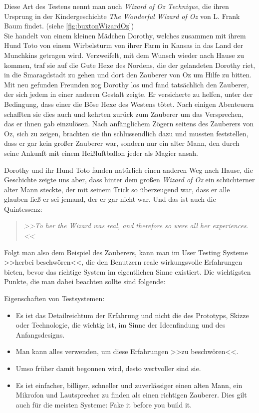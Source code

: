 \medskip Diese Art des Testens nennt man auch \emph{Wizard of Oz Technique}, die ihren Ursprung in der Kindergeschichte \emph{The Wonderful Wizard of Oz} von L. Frank Baum findet. (siehe \autoref{fig:buxtonWizardOz}) \\ Sie handelt von einem kleinen Mädchen Dorothy, welches zusammen mit ihrem Hund Toto von einem Wirbelsturm von ihrer Farm in Kansas in das Land der Munchkins getragen wird. Verzweifelt, mit dem Wunsch wieder nach Hause zu kommen, traf sie auf die Gute Hexe des Nordens, die der gelandeten Dorothy riet, in die Smaragdstadt zu gehen und dort den Zauberer von Oz um Hilfe zu bitten. Mit neu gefunden Freunden zog Dorothy los und fand tatsächlich den Zauberer, der sich jedem in einer anderen Gestalt zeigte. Er versicherte zu helfen, unter der Bedingung, dass einer die Böse Hexe des Westens tötet. Nach einigen Abenteuern schafften sie dies auch und kehrten zurück zum Zauberer um das Versprechen, das er ihnen gab einzulösen. Nach anfänglichem Zögern seitens des Zauberers von Oz, sich zu zeigen, brachten sie ihn schlussendlich dazu und mussten feststellen, dass er gar kein großer Zauberer war, sondern nur ein alter Mann, den durch seine Ankunft mit einem Heißluftballon jeder als Magier ansah. \citep{Baum:2008}

\medskip Dorothy und ihr Hund Toto fanden natürlich einen anderen Weg nach Hause, die Geschichte zeigte uns aber, dass hinter dem großen \emph{Wizard of Oz} ein schüchterner alter Mann steckte, der mit seinem Trick so überzeugend war, dass er alle glauben ließ er sei jemand, der er gar nicht war. Und das ist auch die Quintessenz: 

\begin{quote}
	\textsl{>>To her the Wizard was real, and therefore so were all her experiences.<<}
\begin{flushright}\citep{Buxton:2007}\end{flushright}
\end{quote}

Folgt man also dem Beispiel des Zauberers, kann man im User Testing Systeme >>herbei beschwören<<, die den Benutzern reale wirkungsvolle Erfahrungen bieten, bevor das richtige System im eigentlichen Sinne existiert. Die wichtigsten Punkte, die man dabei beachten sollte sind folgende:

\medskip Eigenschaften von Testsystemen:
\begin{itemize}
	\item Es ist das Detailreichtum der Erfahrung und nicht die des Prototyps, Skizze oder Technologie, die wichtig ist, im Sinne der Ideenfindung und des Anfangsdesigns.
	\item Man kann alles verwenden, um diese Erfahrungen >>zu beschwören<<.
	\item Umso früher damit begonnen wird, desto wertvoller sind sie.
	\item Es ist einfacher, billiger, schneller und zuverlässiger einen alten Mann, ein Mikrofon und Lautsprecher zu finden als einen richtigen Zauberer. Dies gilt auch für die meisten Systeme:  Fake it before you build it.
\end{itemize}
\begin{flushright}\citep{Buxton:2007}\end{flushright}
	

